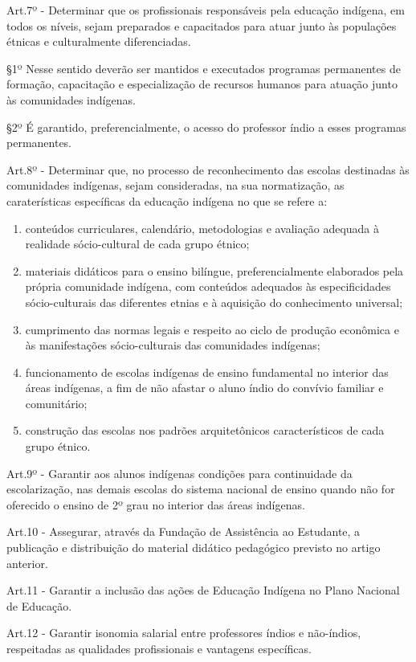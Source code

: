 \documentclass[
]{book}
\begin{document}
Art.7º - Determinar que os profissionais responsáveis pela educação indígena, em todos os níveis, sejam preparados e capacitados para atuar junto às populações étnicas e culturalmente diferenciadas.

§1º Nesse sentido deverão ser mantidos e executados programas permanentes de formação, capacitação e especialização de recursos humanos para atuação junto às comunidades indígenas.

§2º É garantido, preferencialmente, o acesso do professor índio a esses programas permanentes.

Art.8º - Determinar que, no processo de reconhecimento das escolas destinadas às comunidades indígenas, sejam consideradas, na sua normatização, as caraterísticas específicas da educação indígena no que se refere a:

\begin{enumerate}
\def\labelenumi{\alph{enumi})}
\item
  conteúdos curriculares, calendário, metodologias e avaliação adequada à realidade sócio-cultural de cada grupo étnico;
\item
  materiais didáticos para o ensino bilíngue, preferencialmente elaborados pela própria comunidade indígena, com conteúdos adequados às especificidades sócio-culturais das diferentes etnias e à aquisição do conhecimento universal;
\item
  cumprimento das normas legais e respeito ao ciclo de produção econômica e às manifestações sócio-culturais das comunidades indígenas;
\item
  funcionamento de escolas indígenas de ensino fundamental no interior das áreas indígenas, a fim de não afastar o aluno índio do convívio familiar e comunitário;
\item
  construção das escolas nos padrões arquitetônicos característicos de cada grupo étnico.
\end{enumerate}

Art.9º - Garantir aos alunos indígenas condições para continuidade da escolarização, nas demais escolas do sistema nacional de ensino quando não for oferecido o ensino de 2º grau no interior das áreas indígenas.

Art.10 - Assegurar, através da Fundação de Assistência ao Estudante, a publicação e distribuição do material didático pedagógico previsto no artigo anterior.

Art.11 - Garantir a inclusão das ações de Educação Indígena no Plano Nacional de Educação.

Art.12 - Garantir isonomia salarial entre professores índios e não-índios, respeitadas as qualidades profissionais e vantagens específicas.
\end{document}
